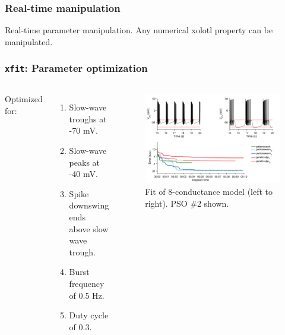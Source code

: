 \documentclass{beamer}
\begin{document}

\begin{frame}
  \frametitle{Real-time manipulation}

    \begin{center}
      \caption{Real-time parameter manipulation. Any numerical xolotl property can be manipulated.}
    \end{center}

\end{frame}

\begin{frame}
  \frametitle{\texttt{xfit}: Parameter optimization}

  \begin{columns}
    Optimized for:

    \begin{enumerate}
      \item Slow-wave troughs at -70 mV.
      \item Slow-wave peaks at -40 mV.
      \item Spike downswing ends above slow wave trough.
      \item Burst frequency of 0.5 Hz.
      \item Duty cycle of 0.3.
    \end{enumerate}

    \begin{figure}
      \includegraphics[width=\textwidth]{gfx/xfit.png}
      \centering
      \caption{Fit of 8-conductance model (left to right). PSO \#2 shown.}
    \end{figure}
  \end{columns}

\end{frame}
\end{document}
